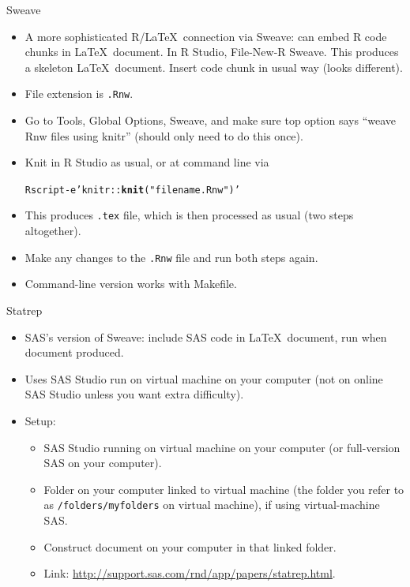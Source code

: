 \documentclass[unknownkeysallowed]{beamer}\usepackage[]{graphicx}\usepackage[]{color}
\makeatletter
\newcommand{\hlstr}[1]{\textcolor[rgb]{0.192,0.494,0.8}{#1}}%
\newcommand{\hlkwd}[1]{\textcolor[rgb]{0.737,0.353,0.396}{\textbf{#1}}}%
\newenvironment{kframe}{%
 \def\at@end@of@kframe{}%
 \ifinner\ifhmode%
  \def\at@end@of@kframe{\end{minipage}}%
  \begin{minipage}{\columnwidth}%
 \fi\fi%
 \def\FrameCommand##1{\hskip\@totalleftmargin \hskip-\fboxsep
 \colorbox{shadecolor}{##1}\hskip-\fboxsep
     \hskip-\linewidth \hskip-\@totalleftmargin \hskip\columnwidth}%
 \MakeFramed {\advance\hsize-\width
   \@totalleftmargin\z@ \linewidth\hsize
   \@setminipage}}%
 {\par\unskip\endMakeFramed%
 \at@end@of@kframe}
\newenvironment{knitrout}{}{} %
\makeatother
\begin{document}
\begin{frame}[fragile]{Sweave}
  \begin{itemize}
  \item A more sophisticated R/\LaTeX\ connection via Sweave: can
    embed R code chunks in \LaTeX\ document. In R Studio, File-New-R
    Sweave. This produces a skeleton \LaTeX\ document. Insert code
    chunk in usual way (looks different).
  \item File extension is \texttt{.Rnw}.
  \item Go to Tools, Global Options, Sweave, and make sure top option
    says ``weave Rnw files using knitr'' (should only need to do this
    once). 
  \item Knit in R Studio as usual, or at command line via
\begin{knitrout}
\color{fgcolor}\begin{kframe}
\begin{alltt}
Rscript -e \hlstr{'knitr::\hlkwd{knit}(\hlstr{"filename.Rnw"})'}
\end{alltt}
\end{kframe}
\end{knitrout}
\item This produces \texttt{.tex} file, which is then processed as
  usual (two steps altogether).
\item Make any changes to the \texttt{.Rnw} file and run both steps
  again.  
\item Command-line version works with Makefile.
  \end{itemize}
\end{frame}

\begin{frame}[fragile]{Statrep}
  
  \begin{itemize}
  \item SAS's version of Sweave: include SAS code in \LaTeX\ document,
    run when document produced.
  \item Uses SAS Studio run on virtual machine on your computer (not
    on online SAS Studio unless you want extra difficulty).
  \item Setup:
    \begin{itemize}
    \item SAS Studio running on virtual machine on your computer (or
      full-version SAS on your computer).
    \item Folder on your computer linked to virtual machine (the
      folder you refer to as \texttt{/folders/myfolders} on virtual
      machine), if using virtual-machine SAS.
    \item Construct document on your computer in that linked folder.
    \item Link: \url{http://support.sas.com/rnd/app/papers/statrep.html}.
    \end{itemize}
  \end{itemize}
  
\end{frame}
\end{document}
